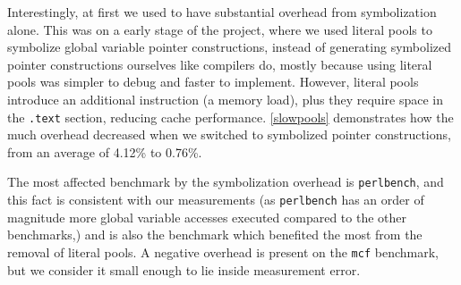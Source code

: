 \documentclass[a4paper,11pt,oneside]{report}
\begin{document}
Interestingly, at first we used to have substantial overhead from symbolization
alone.  This was on a early stage of the project, where we used literal pools
to symbolize global variable pointer constructions, instead of generating
symbolized pointer constructions ourselves like compilers do, mostly because
using literal pools was simpler to debug and faster to implement.  However,
literal pools introduce an additional instruction (a memory load), plus they
require space in the \texttt{.text} section, reducing cache performance.
\autoref{slowpools} demonstrates how the much overhead decreased when we
switched to symbolized pointer constructions, from an average of 4.12\% to
0.76\%. 

The most affected benchmark by the symbolization overhead is
\texttt{perlbench}, and this fact is consistent with our measurements (as
\texttt{perlbench} has an order of magnitude more global variable accesses
executed compared to the other benchmarks,) and is also the benchmark which
benefited the most from the removal of literal pools.  A negative overhead is
present on the \texttt{mcf} benchmark, but we consider it small enough to lie
inside measurement error. 
\end{document}
